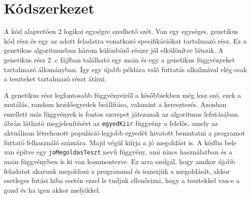 \documentclass[12ppt,a4paper,oneside]{report}
\begin{document}
    \section{Kódszerkezet} %
			{A kód alapvetően 2 logikai egységre szedhető szét. Van egy egységes, genetikus kód rész és egy az adott feladatra vonatkozó specifikációkat tartalmazó rész. Ez a genetikus algoritmusban három különböző részre jól elkülönítve látszik. A genetikus rész 2 .c fájlban található egy main és egy a genetikus függvényeket tartalmazó állományban. Így egy újabb példára való futtatás alkalmával elég csak a teszteket tartalmazó részt átírni.}
			
			{A genetikus rész legfontosabb függvényeiről a későbbiekben még lesz szó, ezek a mutálás, random kezdőegyedek beállítása, valamint a keresztezés. Azonban emellett más függvények is fontos szerepet játszanak az algoritmus lefutásában.  ábrán látható megjelenítésért az \texttt{egyedKiir} függvény a felelős, amely az aktuálisan létrehozott populáció legjobb egyedét hivatott bemutatni a programot futtató felhasználó számára. Majd végül kiírja a jó megoldást is. A kódba bele van építve egy \texttt{joMegoldasTeszt} nevű függvény, ami nincs használatban és a main függvényben is ki van kommentezve. Ez arra szolgál, hogy amikor újabb feladatot akarunk megoldani a programmal és ismerjük a megoldását, akkor esetleges futási hiba esetén ezzel le tudjuk ellenőrizni, hogy a tesztekkel van-e a gond és ha igen akkor melyikkel.}
			
			
\end{document}
